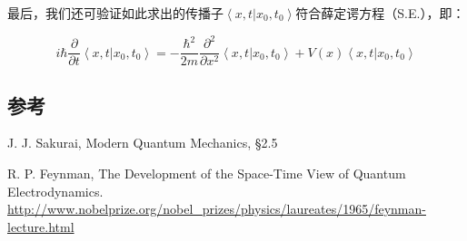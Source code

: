 最后，我们还可验证如此求出的传播子$\left\langle x,t | x_0, t_0 \right\rangle$符合薛定谔方程（S.E.），即：

\begin{equation}
i \hbar \frac{\partial }{\partial t } \left\langle x,t | x_0, t_0 \right\rangle = - \frac{\hbar^2}{ 2 m } \frac{\partial^2 }{\partial x^2 } \left\langle x,t | x_0, t_0 \right\rangle + V (x) \left\langle x,t | x_0, t_0 \right\rangle
\end{equation}

\subsection*{参考}

J. J. Sakurai, Modern Quantum Mechanics, \S 2.5

R. P. Feynman, The Development of the Space-Time View of Quantum Electrodynamics.
\url{http://www.nobelprize.org/nobel_prizes/physics/laureates/1965/feynman-lecture.html}